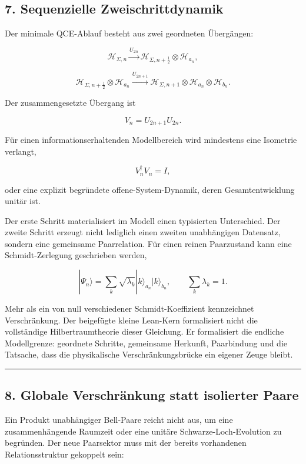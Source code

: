 \documentclass[
  11pt,
  a4paper,
]{article}
\begin{document}
\subsection{7. Sequenzielle
Zweischrittdynamik}\label{sequenzielle-zweischrittdynamik}

Der minimale QCE-Ablauf besteht aus zwei geordneten Übergängen:

\[
\mathcal H_{\Sigma,n}
\xrightarrow{U_{2n}}
\mathcal H_{\Sigma,n+\frac12}
\otimes \mathcal H_{a_n},
\]

\[
\mathcal H_{\Sigma,n+\frac12}
\otimes \mathcal H_{a_n}
\xrightarrow{U_{2n+1}}
\mathcal H_{\Sigma,n+1}
\otimes \mathcal H_{a_n}
\otimes \mathcal H_{b_n}.
\]

Der zusammengesetzte Übergang ist

\[
V_n=U_{2n+1}U_{2n}.
\]

Für einen informationserhaltenden Modellbereich wird mindestens eine
Isometrie verlangt,

\[
V_n^\dagger V_n=I,
\]

oder eine explizit begründete offene-System-Dynamik, deren
Gesamtentwicklung unitär ist.

Der erste Schritt materialisiert im Modell einen typisierten
Unterschied. Der zweite Schritt erzeugt nicht lediglich einen zweiten
unabhängigen Datensatz, sondern eine gemeinsame Paarrelation. Für einen
reinen Paarzustand kann eine Schmidt-Zerlegung geschrieben werden,

\[
|\Psi_n\rangle
=
\sum_k\sqrt{\lambda_k}
|k\rangle_{a_n}|k\rangle_{b_n},
\qquad
\sum_k\lambda_k=1.
\]

Mehr als ein von null verschiedener Schmidt-Koeffizient kennzeichnet
Verschränkung. Der beigefügte kleine Lean-Kern formalisiert nicht die
vollständige Hilbertraumtheorie dieser Gleichung. Er formalisiert die
endliche Modellgrenze: geordnete Schritte, gemeinsame Herkunft,
Paarbindung und die Tatsache, dass die physikalische
Verschränkungsbrücke ein eigener Zeuge bleibt.

\begin{center}\rule{0.5\linewidth}{0.5pt}\end{center}

\subsection{8. Globale Verschränkung statt isolierter
Paare}\label{globale-verschruxe4nkung-statt-isolierter-paare}

Ein Produkt unabhängiger Bell-Paare reicht nicht aus, um eine
zusammenhängende Raumzeit oder eine unitäre Schwarze-Loch-Evolution zu
begründen. Der neue Paarsektor muss mit der bereits vorhandenen
Relationsstruktur gekoppelt sein:
\end{document}
